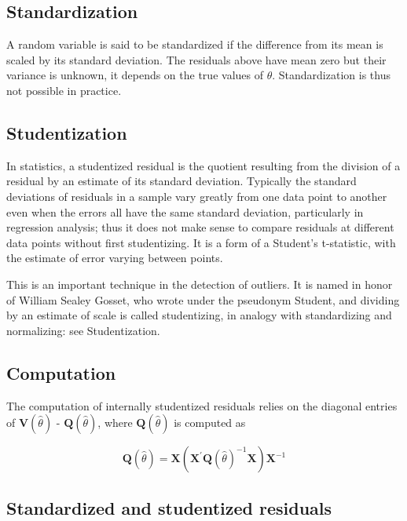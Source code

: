 \documentclass[Main.tex]{subfiles}
\begin{document}
	\subsection{Standardization} %
	
	A random variable is said to be standardized if the difference from its mean is scaled by its standard deviation. The residuals above have mean zero but their variance is unknown, it depends on the true values of $\theta$. Standardization is thus not possible in practice.
	
\subsection{Studentization}
In statistics, a studentized residual is the quotient resulting from the division of a residual by an estimate of its standard deviation. Typically the standard deviations of residuals in a sample vary greatly from one data point to another even when the errors all have the same standard deviation, particularly in regression analysis; thus it does not make sense to compare residuals at different data points without first studentizing. It is a form of a Student's t-statistic, with the estimate of error varying between points.

This is an important technique in the detection of outliers. It is named in honor of William Sealey Gosset, who wrote under the pseudonym Student, and dividing by an estimate of scale is called studentizing, in analogy with standardizing and normalizing: see Studentization.

	

	\subsection{Computation}%
	
	The computation of internally studentized residuals relies on the diagonal entries of $\boldsymbol{V} (\hat{\theta})$ - $\boldsymbol{Q} (\hat{\theta})$, where $\boldsymbol{Q} (\hat{\theta})$ is computed as
	
	\[ \boldsymbol{Q} (\hat{\theta}) = \boldsymbol{X} ( \boldsymbol{X}^{\prime}\boldsymbol{Q} (\hat{\theta})^{-1}\boldsymbol{X})\boldsymbol{X}^{-1} \]
	
	\newpage
\subsection{Standardized and studentized residuals} %
\end{document}
